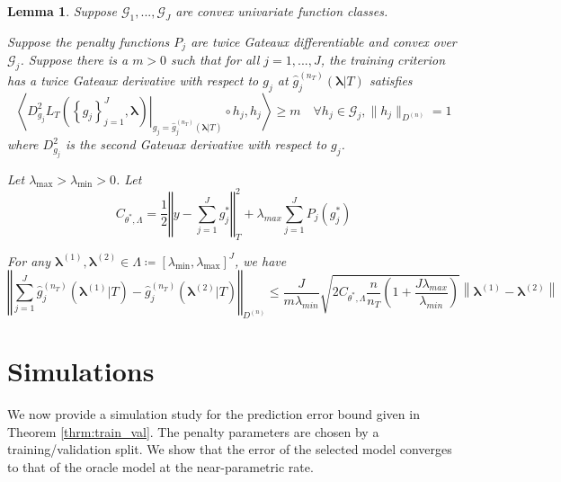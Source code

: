 \documentclass[12pt]{article}
\newtheorem{lemma}{Lemma}
\begin{document}
\begin{lemma}
\label{lemma:nonparam_smooth}
Suppose $\mathcal{G}_1, ..., \mathcal{G}_J$ are convex univariate function classes.

Suppose the penalty functions $P_{j}$ are twice Gateaux differentiable and convex over $\mathcal{G}_j$. Suppose there is a $m > 0$ such that for all $j=1,...,J$, the training criterion has a twice Gateaux derivative with respect to $g_j$ at $\hat{g}^{(n_T)}_j( \boldsymbol{\lambda} | T)$ satisfies
\begin{equation}
\left \langle 
\left . D^2_{g_j} L_T \left ( \left \{ g_j \right \}_{j=1}^J, \boldsymbol{\lambda} \right ) \right |_{g_j= \hat{g}^{(n_T)}_j( \boldsymbol{\lambda} | T) }
\circ h_j, h_j
\right \rangle 
\ge m
\quad \forall h_j \in \mathcal{G}_j,  \|h_j \|_{D^{(n)}} = 1
\end{equation}
where $D^2_{g_j}$ is the second Gateuax derivative with respect to $g_j$.

Let $\lambda_{\max} > \lambda_{\min} > 0 $. Let
\begin{equation}
C_{\theta^{*},\Lambda}=
\frac{1}{2}\left\Vert y- \sum_{j=1}^J g^*_j\right\Vert _{T}^{2}
+\lambda_{max}\sum_{j=1}^{J} P_{j}(g^*_j)
\end{equation}

For any $\boldsymbol{\lambda}^{(1)}, \boldsymbol{\lambda}^{(2)} \in \Lambda \coloneqq \left [ \lambda_{\min}, \lambda_{\max} \right ]^J$, we have
\begin{equation}
\left\Vert 
\sum_{j=1}^J \hat{g}_j^{(n_T)}\left(\boldsymbol{\lambda}^{(1)} |T \right)-\hat{g}_j^{(n_T)}\left(\boldsymbol{\lambda}^{(2)} |T \right)\right\Vert _{D^{(n)}}
\le
\frac{J}{m \lambda_{min}}\sqrt{2C_{\theta^{*},\Lambda}\frac{n}{n_{T}}\left(1+\frac{J\lambda_{max}}{\lambda_{min}}\right)}
\left \|\boldsymbol{\lambda}^{(1)}-\boldsymbol{\lambda}^{(2)} \right \|
\end{equation}
\end{lemma}


\section{Simulations}\label{sec:simulations}

We now provide a simulation study for the prediction error bound given in Theorem \ref{thrm:train_val}. The penalty parameters are chosen by a training/validation split. We show that the error of the selected model converges to that of the oracle model at the near-parametric rate.
\end{document}
